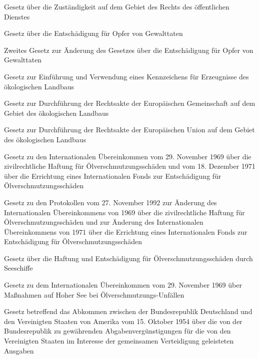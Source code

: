 \item[{ÖDZustG}] Gesetz über die Zuständigkeit auf dem Gebiet des Rechts des öffentlichen Dienstes

\item[{OEG}] Gesetz über die Entschädigung für Opfer von Gewalttaten

\item[{OEGÄndG-2}] Zweites Gesetz zur Änderung des Gesetzes über die Entschädigung für Opfer von Gewalttaten

\item[{ÖkoKennzG}] Gesetz zur Einführung und Verwendung eines Kennzeichens für Erzeugnisse des ökologischen Landbaus

\item[{ÖLG}] Gesetz zur Durchführung der Rechtsakte der Europäischen Gemeinschaft auf dem Gebiet des ökologischen Landbaus

\item[{ÖLG-2009}] Gesetz zur Durchführung der Rechtsakte der Europäischen Union auf dem Gebiet des ökologischen Landbaus

\item[{ÖlHaftG}] Gesetz zu den Internationalen Übereinkommen vom 29. November 1969 über die zivilrechtliche Haftung für Ölverschmutzungsschäden und vom 18. Dezember 1971 über die Errichtung eines Internationalen Fonds zur Entschädigung für Ölverschmutzungsschäden

\item[{ÖlHaftÜbkuaProtG}] Gesetz zu den Protokollen vom 27. November 1992 zur Änderung des Internationalen Übereinkommens von 1969 über die zivilrechtliche Haftung für Ölverschmutzungsschäden und zur Änderung des Internationalen Übereinkommens von 1971 über die Errichtung eines Internationalen Fonds zur Entschädigung für Ölverschmutzungsschäden

\item[{ÖlSG}] Gesetz über die Haftung und Entschädigung für Ölverschmutzungsschäden durch Seeschiffe

\item[{ÖlUnfÜbkG}] Gesetz zu dem Internationalen Übereinkommen vom 29. November 1969 über Maßnahmen auf Hoher See bei Ölverschmutzungs-Unfällen

\item[{OffshStAbkG}] Gesetz betreffend das Abkommen zwischen der Bundesrepublik Deutschland und den Vereinigten Staaten von Amerika vom 15. Oktober 1954 über die von der Bundesrepublik zu gewährenden Abgabenvergünstigungen für die von den Vereinigten Staaten im Interesse der gemeinsamen Verteidigung geleisteten Ausgaben

